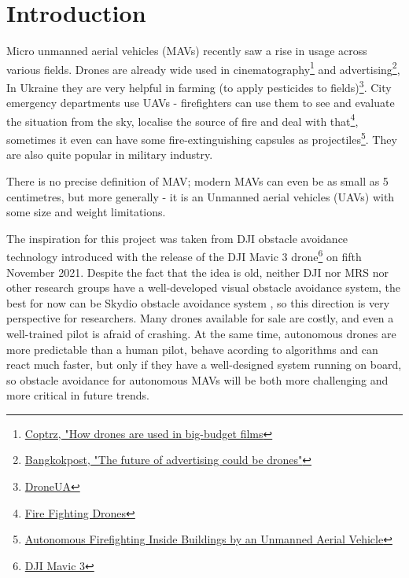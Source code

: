 \chapter{Introduction}
\label{chapter:intro}

Micro unmanned aerial vehicles (MAVs) recently saw a rise in usage across various fields. Drones are already wide used in cinematography\footnote{\href{https://coptrz.com/drones-in-filmmaking-the-best-drones-for-the-job/\#:~:text=How\%20drones\%20are\%20used\%20in\%20big\%2Dbudget\%20films}{Coptrz, "How drones are used in big-budget films}} and advertising\footnote{\href{https://www.bangkokpost.com/business/2124327/the-future-of-advertising-could-be-drones\#:~:text=However\%2C\%20using\%20drones\%20is\%20a,automobile\%20shows\%20and\%20other\%20campaigns.}{Bangkokpost, "The future of advertising could be drones"}}, In Ukraine they are very helpful in farming (to apply pesticides to fields)\footnote{\href{https://techukraine.org/portfolio/droneua-solution-of-field-cultivation-by-drones-up-to-1-million-hectares-in-ukraine/\#:~:text=Since\%202019\%2C\%20spraying\%20drones\%20began,not\%20depend\%20on\%20soil\%20moisture.}{DroneUA}}. City emergency departments use UAVs  - firefighters can use them to see and evaluate the situation from the sky, localise the source of fire and deal with that\footnote{\href{https://www.dslrpros.com/firefighting-drones.html}{Fire Fighting Drones}}, sometimes it even can have some fire-extinguishing capsules as projectiles\footnote{\href{https://ieeexplore.ieee.org/stamp/stamp.jsp?arnumber=9328798}{Autonomous Firefighting Inside Buildings by an Unmanned Aerial Vehicle}}. They are also quite popular in military industry.

There is no precise definition of MAV; modern MAVs can even be as small as 5 centimetres, but more generally - it is an Unmanned aerial vehicles (UAVs) with some size and weight limitations.

The inspiration for this project was taken from DJI obstacle avoidance technology introduced with the release of the DJI Mavic 3 drone\footnote{\href{https://www.dji.com/cz/mavic-3}{DJI Mavic 3}} on fifth November 2021. Despite the fact that the idea is old, neither DJI nor MRS nor other research groups have a well-developed visual obstacle avoidance system, the best for now can be Skydio obstacle avoidance system , so this direction is very perspective for researchers. Many drones available for sale are costly, and even a well-trained pilot is afraid of crashing. At the same time, autonomous drones are more predictable than a human pilot, behave acording to algorithms and can react much faster, but only if they have a well-designed system running on board, so obstacle avoidance for autonomous MAVs will be both more challenging and more critical in future trends.

